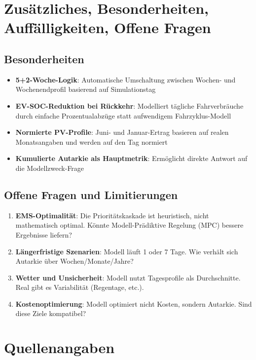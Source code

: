 \documentclass[conference]{IEEEtran}
\begin{document}
\section{Zusätzliches, Besonderheiten, Auffälligkeiten, Offene Fragen}

\subsection{Besonderheiten}

\begin{itemize}
\item \textbf{5+2-Woche-Logik}: Automatische Umschaltung zwischen Wochen- und Wochenendprofil basierend auf Simulationstag
\item \textbf{EV-SOC-Reduktion bei Rückkehr}: Modelliert tägliche Fahrverbräuche durch einfache Prozentualabzüge statt aufwendigem Fahrzyklus-Modell
\item \textbf{Normierte PV-Profile}: Juni- und Januar-Ertrag basieren auf realen Monatsangaben und werden auf den Tag normiert
\item \textbf{Kumulierte Autarkie als Hauptmetrik}: Ermöglicht direkte Antwort auf die Modellzweck-Frage
\end{itemize}

\subsection{Offene Fragen und Limitierungen}

\begin{enumerate}
\item \textbf{EMS-Optimalität}: Die Prioritätskaskade ist heuristisch, nicht mathematisch optimal. Könnte Modell-Prädiktive Regelung (MPC) bessere Ergebnisse liefern?
\item \textbf{Längerfristige Szenarien}: Modell läuft 1 oder 7 Tage. Wie verhält sich Autarkie über Wochen/Monate/Jahre?
\item \textbf{Wetter und Unsicherheit}: Modell nutzt Tagesprofile als Durchschnitte. Real gibt es Variabilität (Regentage, etc.).
\item \textbf{Kostenoptimierung}: Modell optimiert nicht Kosten, sondern Autarkie. Sind diese Ziele kompatibel?
\end{enumerate}

\section{Quellenangaben}
\end{document}
